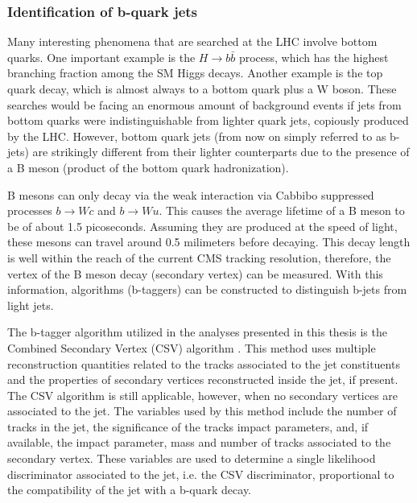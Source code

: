 \subsubsection{Identification of b-quark jets}

Many interesting phenomena that are searched at the LHC involve bottom quarks. 
One important example is the $H\rightarrow b\bar{b}$ process, which has the highest branching fraction among the SM Higgs decays. 
Another example is the top quark decay, which is almost always to a bottom quark plus a W boson. 
These searches would be facing an enormous amount of background events if jets from bottom quarks were indistinguishable from lighter quark jets, copiously produced by the LHC. 
However, bottom quark jets (from now on simply referred to as b-jets) are strikingly different from their lighter counterparts due to the presence of a B meson (product of the bottom quark hadronization). 

B mesons can only decay via the weak interaction via Cabbibo suppressed processes $b\rightarrow Wc$ and $b\rightarrow Wu$. 
This causes the average lifetime of a B meson to be of about 1.5 picoseconds. 
Assuming they are produced at the speed of light, these mesons can travel around 0.5 milimeters before decaying. 
This decay length is well within the reach of the current CMS tracking resolution, therefore, the vertex of the B meson decay (secondary vertex) can be measured. 
With this information, algorithms (b-taggers) can be constructed to distinguish b-jets from light jets.

The b-tagger algorithm utilized in the analyses presented in this thesis is the Combined Secondary Vertex (CSV) algorithm \cite{cms_btag}. 
This method uses multiple reconstruction quantities related to the tracks associated to the jet constituents and the properties of secondary vertices reconstructed inside the jet, if present. 
The CSV algorithm is still applicable, however, when no secondary vertices are associated to the jet. 
The variables used by this method include the number of tracks in the jet, the significance of the tracks impact parameters, and, if available, the impact parameter, mass and number of tracks associated to the secondary vertex. 
These variables are used to determine a single likelihood discriminator associated to the jet, i.e. the CSV discriminator, proportional to the compatibility of the jet with a b-quark decay.













